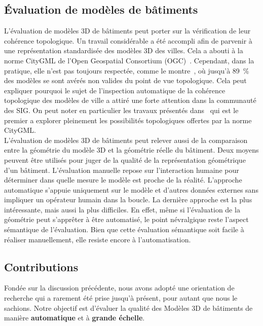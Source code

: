    \subsection*{\'Evaluation de modèles de bâtiments}
        L'évaluation de modèles 3D de bâtiments peut porter sur la vérification de leur cohérence topologique.
        Un travail considérable a été accompli afin de parvenir à une représentation standardisée des modèles 3D des villes.
        Cela a abouti à la norme CityGML de l'Open Geospatial Consortium (OGC)~\parencite{groger2012citygml}.
        Cependant, dans la pratique, elle n'est pas toujours respectée, comme le montre~\parencite{biljecki2016most}, où jusqu'à \SI[locale=FR]{89}{\percent} des modèles se sont avérés non valides du point de vue topologique.
        Cela peut expliquer pourquoi le sujet de l'inspection automatique de la cohérence topologique des modèles de ville a attiré une forte attention dans la communauté des SIG.
        On peut noter en particulier les travaux présentés dans~\parencite{ledoux2013validation} qui est le premier a explorer pleinement les possibilités topologiques offertes par la norme CityGML.\\

        L'évaluation de modèles 3D de bâtiments peut relever aussi de la comparaison entre la géométrie du modèle 3D et la géométrie réelle du bâtiment.
        Deux moyens peuvent être utilisés pour juger de la qualité de la représentation géométrique d'un bâtiment.
        L'évaluation manuelle repose sur l'interaction humaine pour déterminer dans quelle mesure le modèle est proche de la réalité.
        L'approche automatique s'appuie uniquement sur le modèle et d'autres données externes sans impliquer un opérateur humain dans la boucle.
        La dernière approche est la plus intéressante, mais aussi la plus difficiles.
        En effet, même si l'évaluation de la géométrie peut s'apprêter à être automatisé, le point névralgique reste l'aspect sémantique de l'évaluation.
        Bien que cette évaluation sémantique soit facile à réaliser manuellement, elle resiste encore à l'automatisation.

    \subsection*{Contributions}
        Fondée sur la discussion précédente, nous avons adopté une orientation de recherche qui a rarement été prise jusqu'à présent, pour autant que nous le sachions.
        Notre objectif est d'évaluer la qualité des Modèles 3D de bâtiments de manière \textbf{automatique} et à \textbf{grande échelle}.

